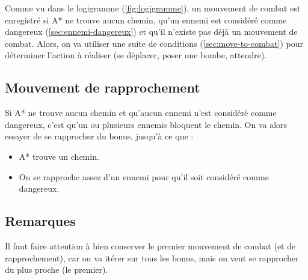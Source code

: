 Comme vu dans le logigramme (\autoref{fig:logigramme}), un mouvement de combat est enregistré si A* ne trouve aucun chemin, qu'un ennemi est considéré comme dangereux (\autoref{sec:ennemi-dangereux}) et qu'il n'existe pas déjà un mouvement de combat.
Alors, on va utiliser une suite de conditions (\autoref{sec:move-to-combat}) pour déterminer l'action à réaliser (se déplacer, poser une bombe, attendre).

\subsection{Mouvement de rapprochement}

Si A* ne trouve aucun chemin et qu'aucun ennemi n'est considéré comme dangereux, c'est qu'un ou plusieurs ennemis bloquent le chemin.
On va alors essayer de se rapprocher du bonus, jusqu'à ce que : 
\begin{itemize}
    \item A* trouve un chemin.
    \item On se rapproche assez d'un ennemi pour qu'il soit considéré comme dangereux.
\end{itemize}

\subsection{Remarques}

Il faut faire attention à bien conserver le premier mouvement de combat (et de rapprochement), car on va itérer sur tous les bonus, mais on veut se rapprocher du plus proche (le premier). 